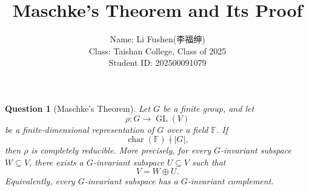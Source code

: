 \documentclass[12pt,a4paper]{ctexart}
\title{Maschke's Theorem and Its Proof}
\author{
  Name: Li Fushen(李福绅) \\
  Class: Taishan College, Class of 2025 \\
  Student ID: 202500091079
}
\date{}
\newtheorem{question}{Question}
\theoremstyle{remark}
\begin{document}
\maketitle

\begin{question}[Maschke's Theorem]
Let \(G\) be a finite group, and let
\[
  \rho: G \longrightarrow \operatorname{GL}(V)
\]
be a finite-dimensional representation of \(G\) over a field \(\mathbb{F}\).
If
\[
  \operatorname{char}(\mathbb{F}) \nmid |G|,
\]
then \(\rho\) is completely reducible. More precisely, for every
\(G\)-invariant subspace \(W \subseteq V\), there exists a \(G\)-invariant
subspace \(U \subseteq V\) such that
\[
  V = W \oplus U.
\]
Equivalently, every \(G\)-invariant subspace has a \(G\)-invariant
complement.
\end{question}
\end{document}
